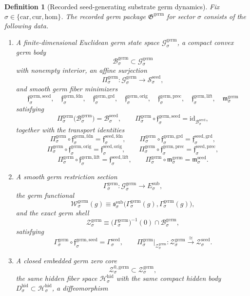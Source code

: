 \documentclass[11pt]{article}
\newcommand{\Car}{\mathrm{car}}
\newcommand{\Cur}{\mathrm{cur}}
\newcommand{\Hom}{\mathrm{hom}}
\newcommand{\SubTarget}[1]{E_{#1}^{\mathrm{sub}}}
\newcommand{\SubPair}[1]{\mathfrak s_{#1}^{\mathrm{sub}}}
\newcommand{\HiddenSpace}[1]{\mathcal H_{#1}^{\mathrm{hid}}}
\newcommand{\HiddenBody}[1]{D_{#1}^{\mathrm{hid}}}
\newcommand{\SeedSpace}[1]{\mathcal S_{#1}^{\mathrm{seed}}}
\newcommand{\SeedBody}[1]{\mathcal B_{#1}^{\mathrm{seed}}}
\newcommand{\SeedFoundMin}[1]{\mathfrak f_{#1}^{\mathrm{seed,fdn}}}
\newcommand{\SeedGroundMin}[1]{\mathfrak f_{#1}^{\mathrm{seed,grd}}}
\newcommand{\SeedOrigMin}[1]{\mathfrak f_{#1}^{\mathrm{seed,orig}}}
\newcommand{\SeedPrecMin}[1]{\mathfrak f_{#1}^{\mathrm{seed,prec}}}
\newcommand{\SeedLiftMin}[1]{\mathfrak f_{#1}^{\mathrm{seed,lift}}}
\newcommand{\SeedSubMin}[1]{\mathfrak m_{#1}^{\mathrm{seed}}}
\newcommand{\SeedSection}[1]{\Gamma_{#1}^{\mathrm{seed}}}
\newcommand{\SeedShellSet}[1]{\mathcal Z_{#1}^{\mathrm{seed}}}
\newcommand{\GermPackage}{\mathfrak G^{\mathrm{germ}}}
\newcommand{\GermSpace}[1]{\mathcal G_{#1}^{\mathrm{germ}}}
\newcommand{\GermBody}[1]{\mathcal B_{#1}^{\mathrm{germ}}}
\newcommand{\GermProj}[1]{\Pi_{#1}^{\mathrm{germ}}}
\newcommand{\GermSeedMin}[1]{\mathfrak f_{#1}^{\mathrm{germ,seed}}}
\newcommand{\GermFoundMin}[1]{\mathfrak f_{#1}^{\mathrm{germ,fdn}}}
\newcommand{\GermGroundMin}[1]{\mathfrak f_{#1}^{\mathrm{germ,grd}}}
\newcommand{\GermOrigMin}[1]{\mathfrak f_{#1}^{\mathrm{germ,orig}}}
\newcommand{\GermPrecMin}[1]{\mathfrak f_{#1}^{\mathrm{germ,prec}}}
\newcommand{\GermLiftMin}[1]{\mathfrak f_{#1}^{\mathrm{germ,lift}}}
\newcommand{\GermSubMin}[1]{\mathfrak m_{#1}^{\mathrm{germ}}}
\newcommand{\GermSection}[1]{\Gamma_{#1}^{\mathrm{germ}}}
\newcommand{\GermFunctional}[1]{\mathscr W_{#1}^{\mathrm{germ}}}
\newcommand{\GermShellSet}[1]{\mathcal Z_{#1}^{\mathrm{germ}}}
\newcommand{\GermZeroCore}[1]{\mathcal Z_{#1}^{0,\mathrm{germ}}}
\newtheorem{definition}{Definition}
\begin{document}
\begin{definition}[Recorded seed-generating substrate germ dynamics]
\label{def:germ}
Fix \(\sigma\in\{\Car,\Cur,\Hom\}\). The recorded germ package \(\GermPackage\) for sector \(\sigma\) consists of the following data.
\begin{enumerate}
    \item A finite-dimensional Euclidean germ state space \(\GermSpace{\sigma}\), a compact convex germ body
    \[
    \GermBody{\sigma}\subset\GermSpace{\sigma}
    \]
    with nonempty interior, an affine surjection
    \[
    \GermProj{\sigma}:\GermSpace{\sigma}\to\SeedSpace{\sigma},
    \]
    and smooth germ fiber minimizers
    \[
    \GermSeedMin{\sigma},\quad
    \GermFoundMin{\sigma},\quad
    \GermGroundMin{\sigma},\quad
    \GermOrigMin{\sigma},\quad
    \GermPrecMin{\sigma},\quad
    \GermLiftMin{\sigma},\quad
    \GermSubMin{\sigma}
    \]
    satisfying
    \[
    \GermProj{\sigma}\bigl(\GermBody{\sigma}\bigr)=\SeedBody{\sigma},
    \qquad
    \GermProj{\sigma}\circ\GermSeedMin{\sigma}
    =
    \mathrm{id}_{\SeedBody{\sigma}},
    \]
    together with the transport identities
    \[
    \GermProj{\sigma}\circ\GermFoundMin{\sigma}
    =
    \SeedFoundMin{\sigma},
    \qquad
    \GermProj{\sigma}\circ\GermGroundMin{\sigma}
    =
    \SeedGroundMin{\sigma},
    \]
    \[
    \GermProj{\sigma}\circ\GermOrigMin{\sigma}
    =
    \SeedOrigMin{\sigma},
    \qquad
    \GermProj{\sigma}\circ\GermPrecMin{\sigma}
    =
    \SeedPrecMin{\sigma},
    \]
    \[
    \GermProj{\sigma}\circ\GermLiftMin{\sigma}
    =
    \SeedLiftMin{\sigma},
    \qquad
    \GermProj{\sigma}\circ\GermSubMin{\sigma}
    =
    \SeedSubMin{\sigma}.
    \]
    \item A smooth germ restriction section
    \[
    \GermSection{\sigma}:\GermSpace{\sigma}\to\SubTarget{\sigma},
    \]
    the germ functional
    \[
    \GermFunctional{\sigma}(g)
    \equiv
    \SubPair{\sigma}\bigl(\GermSection{\sigma}(g),\GermSection{\sigma}(g)\bigr),
    \]
    and the exact germ shell
    \[
    \GermShellSet{\sigma}
    \equiv
    \bigl(\GermSection{\sigma}\bigr)^{-1}(0)\cap\GermBody{\sigma},
    \]
    satisfying
    \[
    \GermSection{\sigma}\circ\GermSeedMin{\sigma}
    =
    \SeedSection{\sigma},
    \qquad
    \GermProj{\sigma}\big|_{\GermShellSet{\sigma}}
    :
    \GermShellSet{\sigma}
    \xrightarrow{\cong}
    \SeedShellSet{\sigma}.
    \]
    \item A closed embedded germ zero core
    \[
    \GermZeroCore{\sigma}\subset\GermShellSet{\sigma},
    \]
    the same hidden fiber space \(\HiddenSpace{\sigma}\) with the same compact hidden body \(\HiddenBody{\sigma}\subset\HiddenSpace{\sigma}\), a diffeomorphism

\end{enumerate}
\end{definition}
\end{document}
